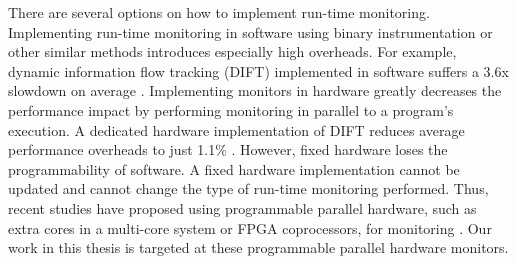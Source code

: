 There are several options on how to implement run-time monitoring.
Implementing run-time monitoring in software using binary instrumentation or
other similar methods introduces especially high overheads. For example,
dynamic information flow tracking (DIFT) implemented in software suffers a 3.6x
slowdown on average \cite{qin06-lift}. Implementing monitors in hardware
greatly decreases the performance impact by performing monitoring in parallel
to a program's execution. A dedicated hardware implementation of DIFT reduces
average performance overheads to just 1.1\% \cite{suh-dift-asplos04}.  However,
fixed hardware loses the programmability of software. A fixed hardware
implementation cannot be updated and cannot change the type of run-time
monitoring performed. Thus, recent studies have proposed using programmable
parallel hardware, such as extra cores in a multi-core system or FPGA
coprocessors, for monitoring \cite{chen08-lba, flexcore-micro10,
harmoni-dsn12}. Our work in this thesis is targeted at these programmable
parallel hardware monitors.

